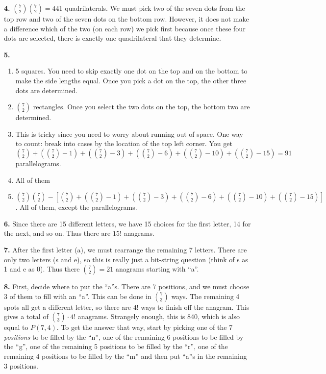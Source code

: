\documentclass[10pt,]{book}
\theoremstyle{plain}
\theoremstyle{definition}
\theoremstyle{definition}
\theoremstyle{definition}
\numberwithin{equation}{chapter}
\begin{document}
\par\smallskip
\noindent\textbf{4.}\quad{}
                \({7\choose 2}{7\choose 2} = 441\) quadrilaterals. We must pick two of the seven dots from the top row and two of the seven dots on the bottom row. However, it does not make a difference which of the two (on each row) we pick first because once these four dots are selected, there is exactly one quadrilateral that they determine.
\par\smallskip
\noindent\textbf{5.}\quad{}\leavevmode%
\begin{enumerate}[label=(\alph*)]
\item\hypertarget{li-485}{} 5 squares. You need to skip exactly one dot on the top and on the bottom to make the side lengths equal.  Once you pick a dot on the top, the other three dots are determined. %
\item\hypertarget{li-486}{}\({7 \choose 2}\) rectangles.  Once you select the two dots on the top, the bottom two are determined.%
\item\hypertarget{li-487}{} This is tricky since you need to worry about running out of space.  One way to count: break into cases by the location of the top left corner.  You get \({7 \choose 2} + ({7 \choose 2}-1) + ({7 \choose 2} - 3) + ({7 \choose 2} - 6) + ({7 \choose 2} - 10) + ({7 \choose 2} - 15) = 91\) parallelograms. %
\item\hypertarget{li-488}{} All of them %
\item\hypertarget{li-489}{} \({7\choose 2}{7\choose 2} - \left[ {7 \choose 2} + ({7 \choose 2}-1) + ({7 \choose 2} - 3) + ({7 \choose 2} - 6) + ({7 \choose 2} - 10) + ({7 \choose 2} - 15) \right]\). All of them, except the parallelograms.%
\end{enumerate}
\par\smallskip
\noindent\textbf{6.}\quad{}
                Since there are 15 different letters, we have 15 choices for the first letter, 14 for the next, and so on. Thus there are \(15!\) anagrams.
\par\smallskip
\noindent\textbf{7.}\quad{}
                After the first letter (a), we must rearrange the remaining 7 letters. There are only two letters (s and e), so this is really just a bit-string question (think of s as 1 and e as 0). Thus there \({7 \choose 2} = 21\) anagrams starting with ``a''.
\par\smallskip
\noindent\textbf{8.}\quad{}
                First, decide where to put the ``a''s. There are 7 positions, and we must choose 3 of them to fill with an ``a''. This can be done in \({7 \choose 3}\) ways. The remaining 4 spots all get a different letter, so there are \(4!\) ways to finish off the anagram. This gives a total of \({7 \choose 3}\cdot 4!\) anagrams. Strangely enough, this is 840, which is also equal to \(P(7,4)\). To get the answer that way, start by picking one of the 7 \emph{positions} to be filled by the ``n'', one of the remaining 6 positions to be filled by the ``g'', one of the remaining 5 positions to be filled by the ``r'', one of the remaining 4 positions to be filled by the ``m'' and then put ``a''s in the remaining 3 positions.
\end{document}
